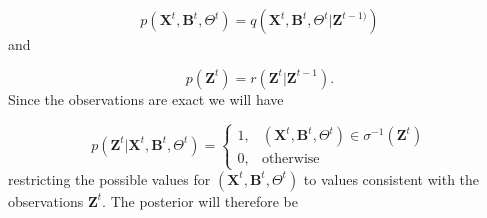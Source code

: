 \documentclass[11pt,a4paper]{article}
\renewcommand{\vec}[1]{\mathbf{#1}}
\begin{document}
\begin{equation*}
    p(\vec{X}^t, \vec{B}^t, \Theta^t) = q(\vec{X}^t, \vec{B}^t, \Theta^t | \vec{Z}^{t-1)})
\end{equation*} 
and

\begin{equation*}
    p(\vec{Z}^t) = r(\vec{Z}^t | \vec{Z}^{t-1}).
\end{equation*}
Since the observations are exact we will have

\begin{equation*}
    p(\vec{Z}^t | \vec{X}^t, \vec{B}^t, \Theta^t) =
    \begin{cases}
        1, & (\vec{X}^t, \vec{B}^t, \Theta^t) \in \sigma^{-1}(\vec{Z}^t) \\
        0, & \text{otherwise}
    \end{cases}
\end{equation*}
restricting the possible values for $(\vec{X}^t, \vec{B}^t, \Theta^t)$ to values consistent with the observations $\vec{Z}^t$.
The posterior will therefore be
\end{document}
